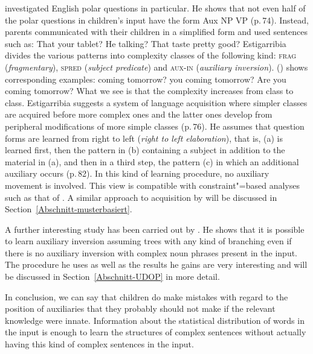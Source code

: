 \citet{Estigarribia2009a} investigated English polar questions in particular. He shows that not even half of the polar questions in children's input have
 the form Aux NP VP (p.\,74).
Instead, parents communicated with their children in a simplified form and used sentences such as:
\eal
\ex That your tablet?
\ex He talking?
\ex That taste pretty good?
\zl
Estigarribia divides the various patterns into complexity classes of the following kind:
\textsc{frag}
(\emph{fragmentary}), \textsc{spred} (\emph{subject predicate}) and \textsc{aux-in} (\emph{auxiliary
  inversion}). () shows corresponding examples:
\eal\settowidth{}
\ex coming tomorrow?         
\ex you coming tomorrow?     
\ex Are you coming tomorrow? 
\zl
What we see is that the complexity increases from class to class. Estigarribia suggests a system of language
acquisition where simpler classes are acquired before more complex ones and the latter ones develop from peripheral
modifications of more simple classes
(p.\,76). He assumes that question forms are learned from right to left
 (\emph{right to left elaboration}), that is, (a) is learned first, then the pattern in (b) containing a subject in addition to the material in (a), and
 then in a third step, the pattern (c) in which an additional auxiliary occurs (p.\,82). 
In this kind of learning procedure, no auxiliary movement is involved. This view is compatible with constraint"=based analyses such as that of
 \citet{GSag2000a-u}. 
A similar approach to acquisition by \citet*{FPAG2007a} will be discussed in Section~\ref{Abschnitt-musterbasiert}.

A further interesting study has been carried out by \citet{Bod2009a}. He shows that it is possible to learn auxiliary inversion
assuming trees with any kind of branching even if there is no auxiliary inversion with complex noun phrases present
in the input. The procedure he uses as well as the results he gains are very interesting and will be discussed 
in Section~\ref{Abschnitt-UDOP} in more detail.

In conclusion, we can say that children do make mistakes with regard to the position of auxiliaries that they
probably should not make if the relevant knowledge were innate. Information about the statistical
distribution of words in the input is enough to learn the structures of complex sentences without
actually having this kind of complex sentences in the input.%

